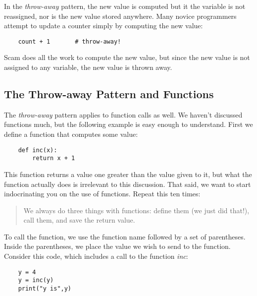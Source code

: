 In the {\it throw-away} pattern, the new value is computed
but it the variable is not reassigned, nor is the
new value stored anywhere. Many novice programmers
attempt to update a counter simply by computing
the new value:

\color{CodeGreen}
\begin{codesize}
\begin{verbatim}
    count + 1       # throw-away!
\end{verbatim}
\end{codesize}
\color{black}

Scam does all the work to compute the new value, but
since the new value is not assigned to any variable,
the new value is thrown away.

\subsection{The Throw-away Pattern and Functions}

The {\it throw-away} pattern applies to function calls
as well.
We haven't discussed functions much, but the following
example is easy enough to understand. First we define
a function that computes some value:

\color{CodeGreen}
\begin{codesize}
\begin{verbatim}
    def inc(x):
        return x + 1
\end{verbatim}
\end{codesize}
\color{black}

This function returns a value one greater than the value
given to it, but what the function actually does is irrelevant
to this discussion. That said, we want to start indocrinating
you on the use of functions. Repeat this ten times:

\begin{quote} We always do three things with functions: define them (we just
did that!), call them, and save the return value.
\end{quote}

To call the function, we use the function name followed by
a set of parentheses. Inside the parentheses, we place the
value we wish to send to the function. Consider this code,
which includes a call to the function {\it inc}:

\color{CodeGreen}
\begin{codesize}
\begin{verbatim}
    y = 4
    y = inc(y)
    print("y is",y)
\end{verbatim}
\end{codesize}
\color{black}


